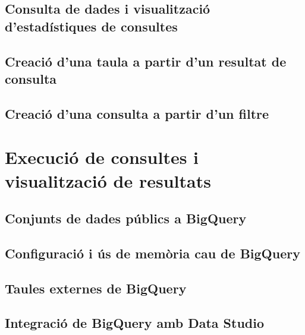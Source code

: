 \documentclass[12pt,longbibliography]{article}
\theoremstyle{definition}
\theoremstyle{remark}
\begin{document}
\subsection{Consulta de dades i visualització d'estadístiques de consultes}

\subsection{Creació d'una taula a partir d'un resultat de consulta}

\subsection{Creació d'una consulta a partir d'un filtre}

\newpage

\section{Execució de consultes i visualització de resultats}

\subsection{Conjunts de dades públics a BigQuery}

\subsection{Configuració i ús de memòria cau de BigQuery}

\subsection{Taules externes de BigQuery}

\subsection{Integració de BigQuery amb Data Studio}

\newpage
\end{document}

